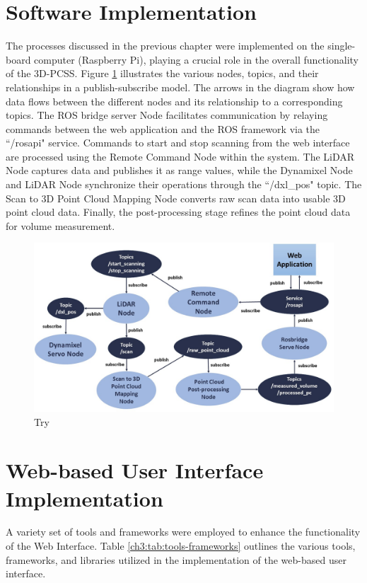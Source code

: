 \section{Software Implementation}

The processes discussed in the previous chapter were implemented on the single-board computer (Raspberry Pi), playing a crucial role in the overall functionality of the 3D-PCSS. Figure \ref{ch4:fig:nodes-topics-relationships} illustrates the various nodes, topics, and their relationships in a publish-subscribe model. The arrows in the diagram show how data flows between the different nodes and its relationship to a corresponding topics. The ROS bridge server Node facilitates communication by relaying commands between the web application and the ROS framework via the ``/rosapi" service. Commands to start and stop scanning from the web interface are processed using the Remote Command Node within the system. The LiDAR Node captures data and publishes it as range values, while the Dynamixel Node and LiDAR Node synchronize their operations through the ``/dxl\_pos" topic. The Scan to 3D Point Cloud Mapping Node converts raw scan data into usable 3D point cloud data. Finally, the post-processing stage refines the point cloud data for volume measurement.

\begin{figure}[H]
	\centering
	\includegraphics[width=1\textwidth]{Figures/nodes-topics-relationship}
	\caption{Try}
	\label{ch4:fig:nodes-topics-relationships}
\end{figure}

\section{Web-based User Interface Implementation}
A variety set of tools and frameworks were employed to enhance the functionality of the Web Interface. Table \ref{ch3:tab:tools-frameworks} outlines the various tools, frameworks, and libraries utilized in the implementation of the web-based user interface.

